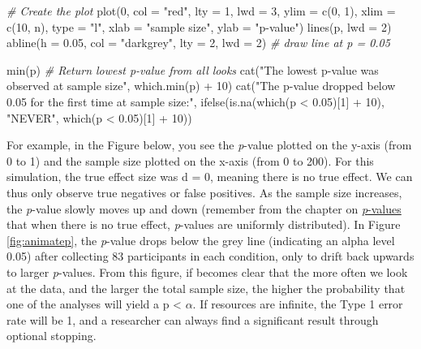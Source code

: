 \documentclass[
]{krantz}
\newenvironment{Shaded}{\begin{snugshade}}{\end{snugshade}}
\newcommand{\AttributeTok}[1]{\textcolor[rgb]{0.77,0.63,0.00}{#1}}
\newcommand{\CommentTok}[1]{\textcolor[rgb]{0.56,0.35,0.01}{\textit{#1}}}
\newcommand{\DecValTok}[1]{\textcolor[rgb]{0.00,0.00,0.81}{#1}}
\newcommand{\FloatTok}[1]{\textcolor[rgb]{0.00,0.00,0.81}{#1}}
\newcommand{\FunctionTok}[1]{\textcolor[rgb]{0.00,0.00,0.00}{#1}}
\newcommand{\NormalTok}[1]{#1}
\newcommand{\SpecialCharTok}[1]{\textcolor[rgb]{0.00,0.00,0.00}{#1}}
\newcommand{\StringTok}[1]{\textcolor[rgb]{0.31,0.60,0.02}{#1}}
\begin{document}
\begin{Shaded}
\begin{Highlighting}[]
\CommentTok{\# Create the plot}
\FunctionTok{plot}\NormalTok{(}\DecValTok{0}\NormalTok{, }\AttributeTok{col =} \StringTok{"red"}\NormalTok{, }\AttributeTok{lty =} \DecValTok{1}\NormalTok{, }\AttributeTok{lwd =} \DecValTok{3}\NormalTok{, }\AttributeTok{ylim =} \FunctionTok{c}\NormalTok{(}\DecValTok{0}\NormalTok{, }\DecValTok{1}\NormalTok{), }\AttributeTok{xlim =} \FunctionTok{c}\NormalTok{(}\DecValTok{10}\NormalTok{, n), }
     \AttributeTok{type =} \StringTok{"l"}\NormalTok{, }\AttributeTok{xlab =} \StringTok{"sample size"}\NormalTok{, }\AttributeTok{ylab =} \StringTok{"p{-}value"}\NormalTok{)}
\FunctionTok{lines}\NormalTok{(p, }\AttributeTok{lwd =} \DecValTok{2}\NormalTok{)}
\FunctionTok{abline}\NormalTok{(}\AttributeTok{h =} \FloatTok{0.05}\NormalTok{, }\AttributeTok{col =} \StringTok{"darkgrey"}\NormalTok{, }\AttributeTok{lty =} \DecValTok{2}\NormalTok{, }\AttributeTok{lwd =} \DecValTok{2}\NormalTok{) }\CommentTok{\# draw line at p = 0.05}

\FunctionTok{min}\NormalTok{(p) }\CommentTok{\# Return lowest p{-}value from all looks}
\FunctionTok{cat}\NormalTok{(}\StringTok{"The lowest p{-}value was observed at sample size"}\NormalTok{, }\FunctionTok{which.min}\NormalTok{(p) }\SpecialCharTok{+} \DecValTok{10}\NormalTok{) }
\FunctionTok{cat}\NormalTok{(}\StringTok{"The p{-}value dropped below 0.05 for the first time at sample size:"}\NormalTok{, }
    \FunctionTok{ifelse}\NormalTok{(}\FunctionTok{is.na}\NormalTok{(}\FunctionTok{which}\NormalTok{(p }\SpecialCharTok{\textless{}} \FloatTok{0.05}\NormalTok{)[}\DecValTok{1}\NormalTok{] }\SpecialCharTok{+} \DecValTok{10}\NormalTok{), }\StringTok{"NEVER"}\NormalTok{, }\FunctionTok{which}\NormalTok{(p }\SpecialCharTok{\textless{}} \FloatTok{0.05}\NormalTok{)[}\DecValTok{1}\NormalTok{] }\SpecialCharTok{+} \DecValTok{10}\NormalTok{)) }
\end{Highlighting}
\end{Shaded}

For example, in the Figure below, you see the \emph{p}-value plotted on the y-axis (from 0 to 1) and the sample size plotted on the x-axis (from 0 to 200). For this simulation, the true effect size was d = 0, meaning there is no true effect. We can thus only observe true negatives or false positives. As the sample size increases, the \emph{p}-value slowly moves up and down (remember from the chapter on \protect\hyperlink{pvalues}{\emph{p}-values} that when there is no true effect, \emph{p}-values are uniformly distributed). In Figure \ref{fig:animatep}, the \emph{p}-value drops below the grey line (indicating an alpha level 0.05) after collecting 83 participants in each condition, only to drift back upwards to larger \emph{p}-values. From this figure, if becomes clear that the more often we look at the data, and the larger the total sample size, the higher the probability that one of the analyses will yield a p \textless{} \(\alpha\). If resources are infinite, the Type 1 error rate will be 1, and a researcher can always find a significant result through optional stopping.
\end{document}
